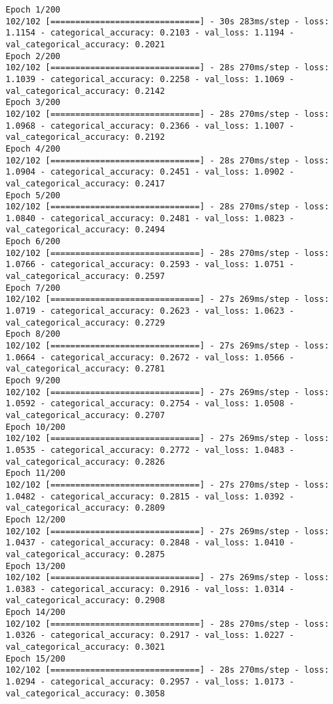 \begin{lstlisting}
Epoch 1/200
102/102 [==============================] - 30s 283ms/step - loss: 1.1154 - categorical_accuracy: 0.2103 - val_loss: 1.1194 - val_categorical_accuracy: 0.2021
Epoch 2/200
102/102 [==============================] - 28s 270ms/step - loss: 1.1039 - categorical_accuracy: 0.2258 - val_loss: 1.1069 - val_categorical_accuracy: 0.2142
Epoch 3/200
102/102 [==============================] - 28s 270ms/step - loss: 1.0968 - categorical_accuracy: 0.2366 - val_loss: 1.1007 - val_categorical_accuracy: 0.2192
Epoch 4/200
102/102 [==============================] - 28s 270ms/step - loss: 1.0904 - categorical_accuracy: 0.2451 - val_loss: 1.0902 - val_categorical_accuracy: 0.2417
Epoch 5/200
102/102 [==============================] - 28s 270ms/step - loss: 1.0840 - categorical_accuracy: 0.2481 - val_loss: 1.0823 - val_categorical_accuracy: 0.2494
Epoch 6/200
102/102 [==============================] - 28s 270ms/step - loss: 1.0766 - categorical_accuracy: 0.2593 - val_loss: 1.0751 - val_categorical_accuracy: 0.2597
Epoch 7/200
102/102 [==============================] - 27s 269ms/step - loss: 1.0719 - categorical_accuracy: 0.2623 - val_loss: 1.0623 - val_categorical_accuracy: 0.2729
Epoch 8/200
102/102 [==============================] - 27s 269ms/step - loss: 1.0664 - categorical_accuracy: 0.2672 - val_loss: 1.0566 - val_categorical_accuracy: 0.2781
Epoch 9/200
102/102 [==============================] - 27s 269ms/step - loss: 1.0592 - categorical_accuracy: 0.2754 - val_loss: 1.0508 - val_categorical_accuracy: 0.2707
Epoch 10/200
102/102 [==============================] - 27s 269ms/step - loss: 1.0535 - categorical_accuracy: 0.2772 - val_loss: 1.0483 - val_categorical_accuracy: 0.2826
Epoch 11/200
102/102 [==============================] - 27s 270ms/step - loss: 1.0482 - categorical_accuracy: 0.2815 - val_loss: 1.0392 - val_categorical_accuracy: 0.2809
Epoch 12/200
102/102 [==============================] - 27s 269ms/step - loss: 1.0437 - categorical_accuracy: 0.2848 - val_loss: 1.0410 - val_categorical_accuracy: 0.2875
Epoch 13/200
102/102 [==============================] - 27s 269ms/step - loss: 1.0383 - categorical_accuracy: 0.2916 - val_loss: 1.0314 - val_categorical_accuracy: 0.2908
Epoch 14/200
102/102 [==============================] - 28s 270ms/step - loss: 1.0326 - categorical_accuracy: 0.2917 - val_loss: 1.0227 - val_categorical_accuracy: 0.3021
Epoch 15/200
102/102 [==============================] - 28s 270ms/step - loss: 1.0294 - categorical_accuracy: 0.2957 - val_loss: 1.0173 - val_categorical_accuracy: 0.3058

\end{lstlisting}
